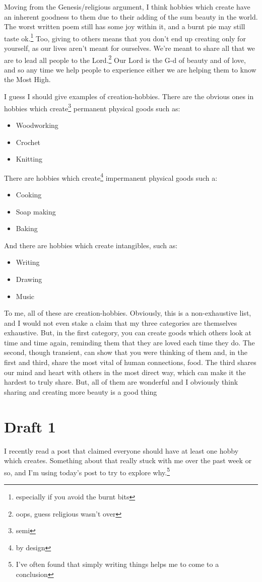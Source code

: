 \documentclass[12pt]{article}[titlepage]
\newcommand{\1}{\={a}}
\newcommand{\2}{\={e}}
\newcommand{\3}{\={\i}}
\newcommand{\4}{\=o}
\newcommand{\5}{\=u}
\newcommand{\6}{\={A}}
\renewcommand{\,}{\textsuperscript{,}}
\begin{document}
Moving from the Genesis/religious argument, I think hobbies which create have an inherent goodness to them due to their adding of the sum beauty in the world.
The worst written poem still has some joy within it, and a burnt pie may still taste ok.\footnote{especially if you avoid the burnt bits}
Too, giving to others means that you don't end up creating only for yourself, as our lives aren't meant for ourselves.
We're meant to share all that we are to lead all people to the Lord.\footnote{oops, guess religious wasn't over}
Our Lord is the G-d of beauty and of love, and so any time we help people to experience either we are helping them to know the Most High.

I guess I should give examples of creation-hobbies.
There are the obvious ones in hobbies which create\footnote{semi} permanent physical goods such as:
\begin{itemize}
\item Woodworking
\item Crochet
\item Knitting
\end{itemize}
There are hobbies which create\footnote{by design} impermanent physical goods such a:
\begin{itemize}
\item Cooking
\item Soap making
\item Baking
\end{itemize}
And there are hobbies which create intangibles, such as:
\begin{itemize}
\item Writing
\item Drawing
\item Music
\end{itemize}
To me, all of these are creation-hobbies.
Obviously, this is a non-exhaustive list, and I would not even stake a claim that my three categories are themselves exhaustive.
But, in the first category, you can create goods which others look at time and time again, reminding them that they are loved each time they do.
The second, though transient, can show that you were thinking of them and, in the first and third, share the most vital of human connections, food.
The third shares our mind and heart with others in the most direct way, which can make it the hardest to truly share.
But, all of them are wonderful and I obviously think sharing and creating more beauty is a good thing
\section{Draft 1}
I recently read a post that claimed everyone should have at least one hobby which creates.
Something about that really stuck with me over the past week or so, and I'm using today's post to try to explore why.\footnote{I've often found that simply writing things helps me to come to a conclusion}
\end{document}

